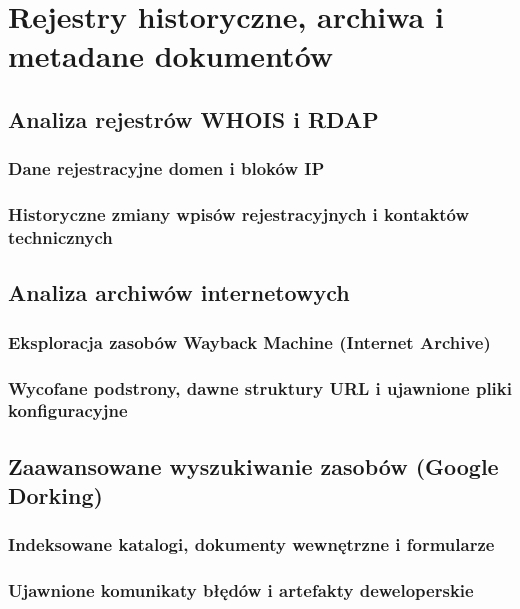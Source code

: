 \chapter{Rejestry historyczne, archiwa i metadane dokumentów}\label{ch:archiwa-metadane}

\section{Analiza rejestrów WHOIS i RDAP}\label{sec:whois}
\subsection{Dane rejestracyjne domen i bloków IP}\label{subsec:whois-aktualne}
\subsection{Historyczne zmiany wpisów rejestracyjnych i kontaktów technicznych}\label{subsec:whois-historia}

\section{Analiza archiwów internetowych}\label{sec:archiwa-www}
\subsection{Eksploracja zasobów Wayback Machine (Internet Archive)}\label{subsec:wayback-machine}
\subsection{Wycofane podstrony, dawne struktury URL i ujawnione pliki konfiguracyjne}\label{subsec:wycofane-zasoby}

\section{Zaawansowane wyszukiwanie zasobów (Google Dorking)}\label{sec:google-dorking}
\subsection{Indeksowane katalogi, dokumenty wewnętrzne i formularze}\label{subsec:dorking-dokumenty}
\subsection{Ujawnione komunikaty błędów i artefakty deweloperskie}\label{subsec:dorking-bledy}

